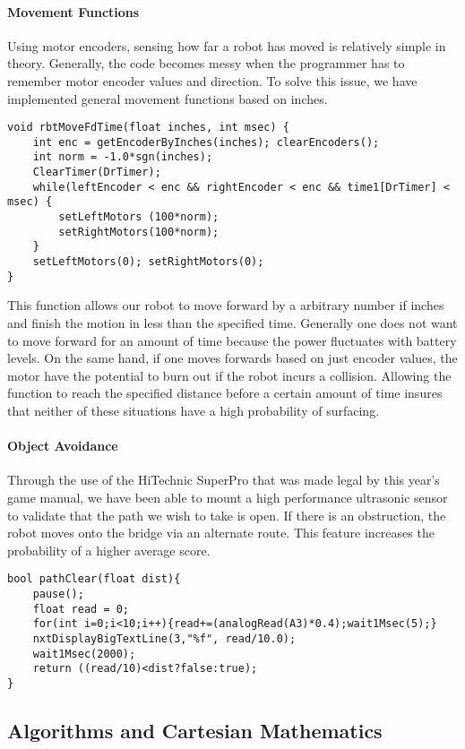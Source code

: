 \paragraph{Movement Functions} Using motor encoders, sensing how far a robot has moved is relatively simple in theory. Generally, the code becomes messy when the programmer has to remember motor encoder values and direction. To solve this issue, we have implemented general movement functions based on inches.
\begin{lstlisting}[tabsize=4]
void rbtMoveFdTime(float inches, int msec) {
	int enc = getEncoderByInches(inches); clearEncoders();
	int norm = -1.0*sgn(inches);
	ClearTimer(DrTimer);
	while(leftEncoder < enc && rightEncoder < enc && time1[DrTimer] < msec) {
		setLeftMotors (100*norm);
		setRightMotors(100*norm);
	}
	setLeftMotors(0); setRightMotors(0);
}
\end{lstlisting}
This function allows our robot to move forward by a arbitrary number if inches and finish the motion in less than the specified time. Generally one does not want to move forward for an amount of time because the power fluctuates with battery levels. On the same hand, if one moves forwards based on just encoder values, the motor have the potential to burn out if the robot incurs a collision. Allowing the function to reach the specified distance before a certain amount of time insures that neither of these situations have a high probability of surfacing.

\paragraph{Object Avoidance} Through the use of the HiTechnic SuperPro that was made legal by this year's game manual, we have been able to mount a high performance ultrasonic sensor to validate that the path we wish to take is open. If there is an obstruction, the robot moves onto the bridge via an alternate route. This feature increases the probability of a higher average score.

\begin{lstlisting}[tabsize=4]
bool pathClear(float dist){
	pause();
	float read = 0;
	for(int i=0;i<10;i++){read+=(analogRead(A3)*0.4);wait1Msec(5);}
	nxtDisplayBigTextLine(3,"%f", read/10.0);
	wait1Msec(2000);
	return ((read/10)<dist?false:true);
}
\end{lstlisting}

\newpage \subsection{Algorithms and Cartesian Mathematics}

